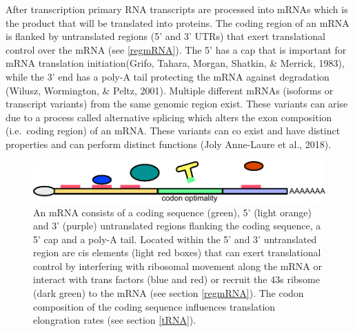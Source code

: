 \documentclass[12pt,openany]{book}
\begin{document}
After transcription primary RNA transcripts are processed into mRNAs
which is the product that will be translated into proteins. The coding
region of an mRNA is flanked by untranslated regions (5' and 3' UTRs)
that exert translational control over the mRNA (see \ref{regmRNA}). The
5' has a cap that is important for mRNA translation initiation(Grifo,
Tahara, Morgan, Shatkin, \& Merrick, 1983), while the 3' end has a
poly-A tail protecting the mRNA against degradation (Wilusz, Wormington,
\& Peltz, 2001). Multiple different mRNAs (isoforms or transcript
variants) from the same genomic region exist. These variants can arise
due to a process called alternative splicing which alters the exon
composition (i.e.~coding region) of an mRNA. These variants can co exist
and have distinct properties and can perform distinct functions (Joly
Anne-Laure et al., 2018).

\begin{figure}
  \includegraphics{./figures/UTRFeatures.pdf}
  \caption{ An mRNA consists of a coding sequence (green), 5' (light orange) and 3' (purple) untranslated regions flanking the coding sequence, a 5' cap and a poly-A tail. Located within the 5' and 3' untranslated region are cis elements (light red boxes) that can exert translational control by interfering with ribosomal movement along the mRNA or interact with trans factors (blue and red) or recruit the 43s ribsome (dark green) to the mRNA (see section \ref{regmRNA}). The codon composition of the coding sequence influences translation elongration rates (see section \ref{tRNA}).   
 \label{fig:UTRFeat}}
\end{figure}

\clearpage
\end{document}

